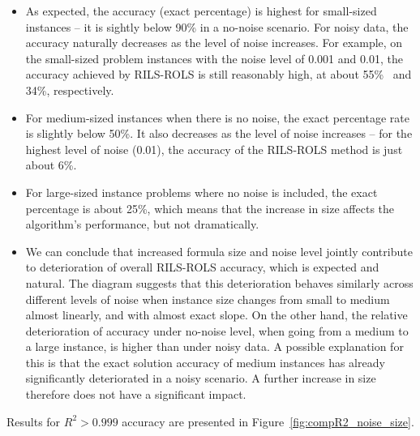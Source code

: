 \documentclass{bmcart}
\begin{document}
\begin{itemize}
	\item  As expected, the accuracy (exact percentage) is highest for small-sized instances -- it is sightly below 90\% in a no-noise scenario. For noisy data, the accuracy naturally decreases as the level of noise increases. For example, on the small-sized problem instances with the noise level of 0.001 and 0.01, the accuracy achieved by \textsc{RILS}-\textsc{ROLS} is still reasonably high, at about 55\%~ and 34\%, respectively. 
	\item For medium-sized instances when there is no noise, the exact percentage rate is slightly below 50\%. It also decreases as the level of noise increases -- for the highest level of noise (0.01), the accuracy of the \textsc{RILS}-\textsc{ROLS} method is just about 6\%. 
	\item For large-sized instance problems where no noise is included, the exact percentage is about 25\%, which means that the increase in size affects the algorithm's performance, but not dramatically.  
	
	\item We can conclude that increased formula size and noise level jointly contribute to deterioration of overall \textsc{RILS-ROLS} accuracy, which is expected and natural. The diagram suggests that this deterioration behaves similarly across different levels of noise when instance size changes from small to medium almost linearly, and with almost exact slope. On the other hand, the relative deterioration of accuracy under no-noise level, when going from a medium to a large instance, is higher than under noisy data. A possible explanation for this is that the exact solution accuracy of medium instances has already significantly deteriorated in a noisy scenario. A further increase in size therefore does not have a significant impact. 
\end{itemize}
	
Results for $R^2 > 0.999$ accuracy are presented in Figure~\ref{fig:compR2_noise_size}. 

\begin{center}
	\label{fig:compR2_noise_size}
\end{center}
\end{document}
